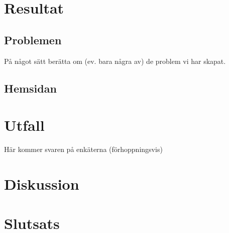\section{Resultat}
    \subsection{Problemen}
        På något sätt berätta om (ev. bara några av) de problem vi har skapat.
    
    \subsection{Hemsidan}

\section{Utfall}
    Här kommer svaren på enkäterna (förhoppningsvis)

\section{Diskussion}

\section{Slutsats}
